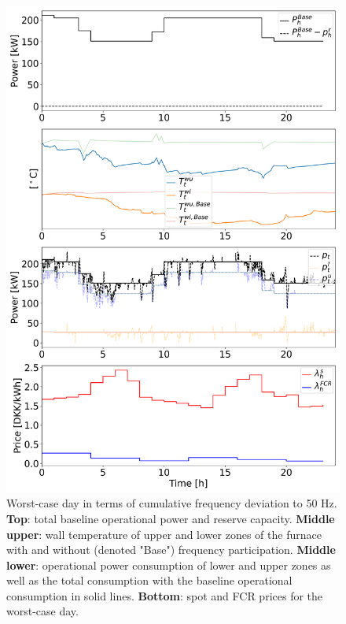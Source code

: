 \documentclass[conference]{IEEEtran}
\begin{document}
\begin{figure}[t]
    \centering
    \includegraphics[width=\columnwidth]{../figures/fcr_single_case.png}
    \caption{Worst-case day in terms of cumulative frequency deviation to 50 Hz. \textbf{Top}: total baseline operational power and reserve capacity. \textbf{Middle upper}: wall temperature of upper and lower zones of the furnace with and without (denoted "Base") frequency participation. \textbf{Middle lower}: operational power consumption of lower and upper zones as well as the total consumption with the baseline operational consumption in solid lines. \textbf{Bottom}: spot and FCR prices for the worst-case day.}
    \label{fig:fcr_single_case}
\end{figure}
\end{document}
